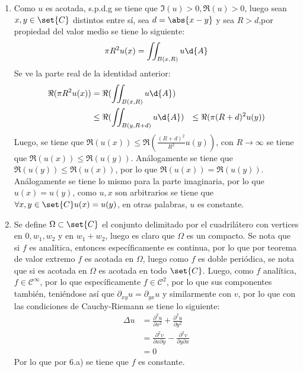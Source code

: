 \documentclass{homework}
\begin{document}
\begin{sol}
    \begin{enumerate}[label=(\alph*)]
        \item Como \(u\) es acotada, s.p.d.g se tiene que \(\Im(u)>0,\Re(u)>0\), luego sean \(x,y\in\set{C}\) distintos entre sí, sea \(d=\abs{x-y}\) y sea \(R>d\),por propiedad del valor medio se tiene lo siguiente:
        \begin{equation}
            \pi R^2 u(x)=\iint_{B(x,R)}u\d{A}\label{eqhar}
        \end{equation}
        Se ve la parte real de la identidad anterior:
        \begin{align*}
            \Re(\pi R^2 u(x))&=\Re(\iint_{B(x,R)}u\d{A})\\
            &\leq\Re(\iint_{B(y,R+d)}u\d{A})
            &\leq\Re(\pi(R+d)^2 u(y))
        \end{align*}
        Luego, se tiene que \(\Re(u(x))\leq\Re(\frac{(R+d)^2}{R^2} u(y))\), con \(R\rightarrow\infty\) se tiene que \(\Re(u(x))\leq\Re(u(y))\). Análogamente se tiene que \(\Re(u(y))\leq\Re(u(x))\), por lo que \(\Re(u(x))=\Re(u(y))\). Análogamente se tiene lo mismo para la parte imaginaria, por lo que \(u(x)=u(y)\), como \(u,x\) son arbitrarios se tiene que \(\forall x,y\in\set{C} u(x)=u(y)\), en otras palabras, \(u\) es constante.
        \item Se define \(\Omega\subset\set{C}\) el conjunto delimitado por el cuadrilátero con vertices en \(0,w_1,w_2\) y en \(w_1+w_2\), luego es claro que \(\Omega\) es un compacto. Se nota que si \(f\) es analítica, entonces específicamente es continua, por lo que por teorema de valor extremo \(f\) es acotada en \(\Omega\), luego como \(f\) es doble periódica, se nota que si es acotada en \(\Omega\) es acotada en todo \(\set{C}\). Luego, como \(f\) analítica, \(f\in\mathcal{C}^\infty\), por lo que específicamente \(f\in\mathcal{C}^2\), por lo que sus componentes también, teniéndose así que \(\partial_{xy} u=\partial_{yx} u\) y similarmente con \(v\), por lo que con las condiciones de Cauchy-Riemann se tiene lo siguiente:
        \begin{align*}
            \Delta u&=\frac{\partial^2 u}{\partial x^2}+\frac{\partial^2 u}{\partial y^2}\\
            &=\frac{\partial^2 v}{\partial x\partial y}-\frac{\partial^2 v}{\partial y\partial x}\\
            &=0
        \end{align*}
        Por lo que por 6.a) se tiene que \(f\) es constante.
    \end{enumerate}
\end{sol}
\end{document}
